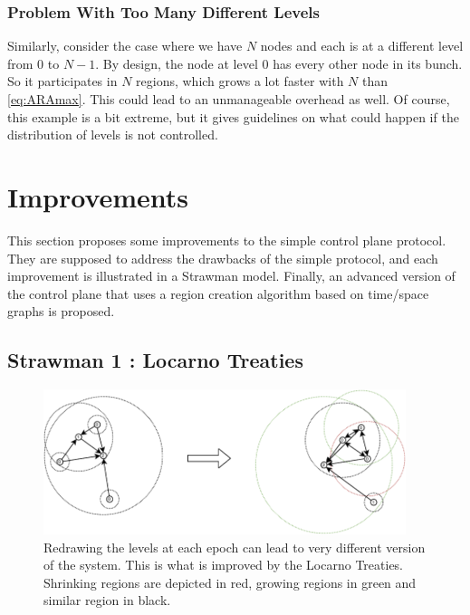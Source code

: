 \documentclass[a4paper,11pt,twoside,openright]{report}
\begin{document}
\subsection{Problem With Too Many Different Levels} Similarly, consider the case
where we have $N$ nodes and each is at a different level from $0$ to $N-1$. By
design, the node at level $0$ has every other node in its bunch. So it
participates in $N$ regions, which grows a lot faster with $N$ than
\autoref{eq:ARAmax}. This could lead to an unmanageable overhead as well. Of
course, this example is a bit extreme, but it gives guidelines on what could
happen if the distribution of levels is not controlled.

\chapter{Improvements} \label{chap:Improvements} %

This section proposes some improvements to the simple control plane protocol. They
are supposed to address the drawbacks of the simple protocol, and each improvement
is illustrated in a Strawman model. Finally, an advanced
version of the control plane that uses a region creation algorithm based on
time/space graphs is proposed. 

\section{Strawman 1 : Locarno Treaties} \label{Locarno}

\begin{figure}[!h] 
\centering
\includegraphics[width=300pt]{figures/LocarnoTreaties-Redrawing}
\caption{Redrawing the levels at each epoch can lead to very different version
 of the system. This is what is improved by the Locarno Treaties. Shrinking
 regions are depicted in red, growing regions in green and similar region in
 black.} \label{fig:LocarnoTreaties-Redrawing}
\end{figure}
\end{document}
